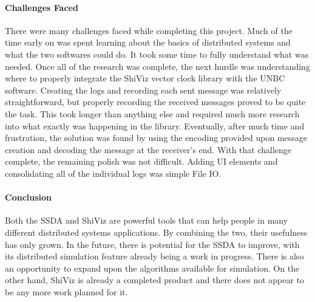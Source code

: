 \documentclass[12pt, oneside]{article}   	%
\begin{document}
\paragraph{Challenges Faced}

There were many challenges faced while completing this project.  Much of the time early on was spent learning about the basics of distributed systems and what the two softwares could do.  It took some time to fully understand what was needed.  Once all of the research was complete, the next hurdle was understanding where to properly integrate the ShiViz vector clock library with the UNBC software.  Creating the logs and recording each sent message was relatively straightforward, but properly recording the received messages proved to be quite the task.  This took longer than anything else and required much more research into what exactly was happening in the library.  Eventually, after much time and frustration, the solution was found by using the encoding provided upon message creation and decoding the message at the receiver's end.  With that challenge complete, the remaining polish was not difficult.  Adding UI elements and consolidating all of the individual logs was simple File IO.

\paragraph{Conclusion}

Both the SSDA and ShiViz are powerful tools that can help people in many different distributed systems applications.  By combining the two, their usefulness has only grown.  In the future, there is potential for the SSDA to improve, with its distributed simulation feature already being a work in progress.  There is also an opportunity to expand upon the algorithms available for simulation.  On the other hand, ShiViz is already a completed product and there does not appear to be any more work planned for it.
\newpage


\end{document}
